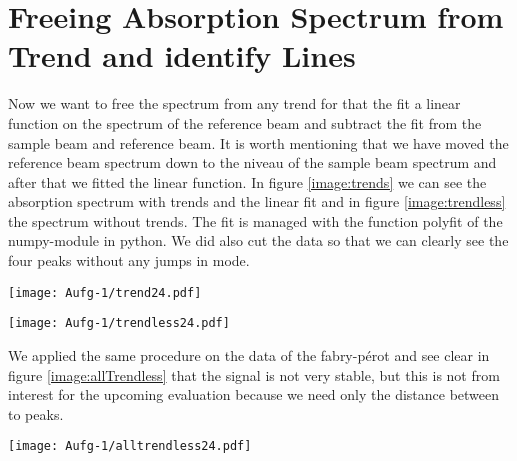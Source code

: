 
\section{Freeing Absorption Spectrum from Trend and identify Lines}
Now we want to free the spectrum from any trend for that the fit a linear function on the spectrum of the reference beam and subtract the fit from the sample beam and reference beam. It is worth mentioning that we have moved the reference beam spectrum down to the niveau of the sample beam spectrum and after that we fitted the linear function. In figure \ref{image:trends} we can see the absorption spectrum with trends and the linear fit and in figure \ref{image:trendless} the spectrum without trends. The fit is managed with the function polyfit of the numpy-module in python. We did also cut the data so that we can clearly see the four peaks without any jumps in mode.
\begin{center}
    \texttt{[image: Aufg-1/trend24.pdf]}
    \label{image:trends}
\end{center}
\begin{center}
    \texttt{[image: Aufg-1/trendless24.pdf]}
    \label{image:trendless}
\end{center}
We applied the same procedure on the data of the fabry-pérot and see clear in figure \ref{image:allTrendless} that the signal is not very stable, but this is not from interest for the upcoming evaluation because we need only the distance between to peaks.
\begin{center}
    \texttt{[image: Aufg-1/alltrendless24.pdf]}
    \label{image:allTrendless}
\end{center}
